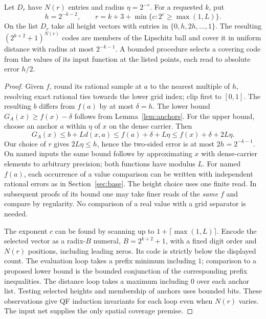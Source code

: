 \begin{theorem}\label{thm:inner}
Let $D_r$ have $N(r)$ entries and radius $\eta=2^{-r}$. For a requested $k$, put
\[
 h=2^{-k-2},\qquad
 r=k+3+\min\{c:2^c\ge\max(1,L)\}.
\]
On the list $D_r$ take all height vectors with entries in $\{0,h,2h,\ldots,1\}$. The resulting $(2^{k+2}+1)^{N(r)}$ codes are members of the Lipschitz ball and cover it in uniform distance with radius at most $2^{-k-1}$. A bounded procedure selects a covering code from the values of its input function at the listed points, each read to absolute error $h/2$.
\end{theorem}
\begin{proof}
Given $f$, round its rational sample at $a$ to the nearest multiple of $h$, resolving exact rational ties towards the lower grid index; clip first to $[0,1]$. The resulting $b$ differs from $f(a)$ by at most $\delta=h$. The lower bound $G_A(x)\ge f(x)-\delta$ follows from Lemma~\ref{lem:anchors}. For the upper bound, choose an anchor $a$ within $\eta$ of $x$ on the dense carrier. Then
\[
 G_A(x)\le b+Ld(x,a)
     \le f(a)+\delta+L\eta
     \le f(x)+\delta+2L\eta.
\]
Our choice of $r$ gives $2L\eta\le h$, hence the two-sided error is at most $2h=2^{-k-1}$. On named inputs the same bound follows by approximating $x$ with dense-carrier elements to arbitrary precision; both functions have modulus $L$. For named $f(a)$, each occurrence of a value comparison can be written with independent rational errors as in Section~\ref{sec:base}. The height choice uses one finite read. In subsequent proofs of its bound one may take finer reads of the \emph{same} $f$ and compare by regularity. No comparison of a real value with a grid separator is needed.

The exponent $c$ can be found by scanning up to $1+\lceil\max(1,L)\rceil$. Encode the selected vector as a radix-$B$ numeral, $B=2^{k+2}+1$, with a fixed digit order and $N(r)$ positions, including leading zeros. Its code is strictly below the displayed count. The evaluation loop takes a prefix minimum including $1$; comparison to a proposed lower bound is the bounded conjunction of the corresponding prefix inequalities. The distance loop takes a maximum including $0$ over each anchor list. Testing selected heights and membership of anchors uses bounded bits. These observations give QF induction invariants for each loop even when $N(r)$ varies. The input net supplies the only spatial coverage premise.
\end{proof}

